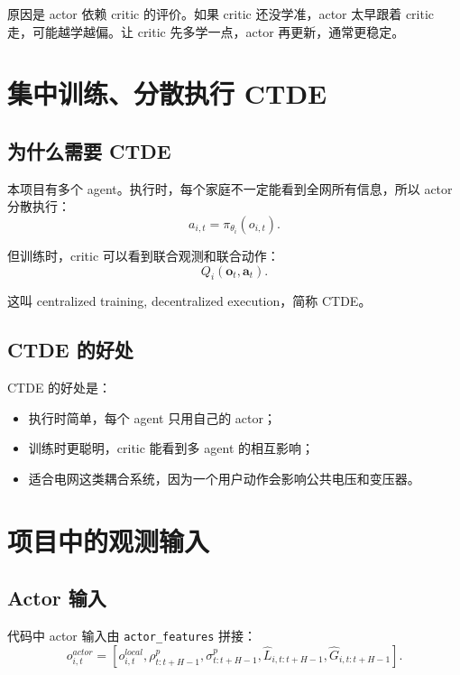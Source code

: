 \documentclass[UTF8,zihao=-4]{ctexart}
\begin{document}
原因是 actor 依赖 critic 的评价。如果 critic 还没学准，actor 太早跟着 critic 走，可能越学越偏。让 critic 先多学一点，actor 再更新，通常更稳定。

\section{集中训练、分散执行 CTDE}

\subsection{为什么需要 CTDE}

本项目有多个 agent。执行时，每个家庭不一定能看到全网所有信息，所以 actor 分散执行：
\begin{equation}
a_{i,t}=\pi_{\theta_i}(o_{i,t}).
\end{equation}

但训练时，critic 可以看到联合观测和联合动作：
\begin{equation}
Q_i(\bm{o}_t,\bm{a}_t).
\end{equation}

这叫 centralized training, decentralized execution，简称 CTDE。

\subsection{CTDE 的好处}

CTDE 的好处是：
\begin{itemize}
  \item 执行时简单，每个 agent 只用自己的 actor；
  \item 训练时更聪明，critic 能看到多 agent 的相互影响；
  \item 适合电网这类耦合系统，因为一个用户动作会影响公共电压和变压器。
\end{itemize}

\section{项目中的观测输入}

\subsection{Actor 输入}

代码中 actor 输入由 \texttt{actor\_features} 拼接：
\begin{equation}
o^{actor}_{i,t}
=
\left[
o^{local}_{i,t},
\rho^p_{t:t+H-1},
\sigma^p_{t:t+H-1},
\hat L_{i,t:t+H-1},
\hat G_{i,t:t+H-1}
\right].
\end{equation}
\end{document}
